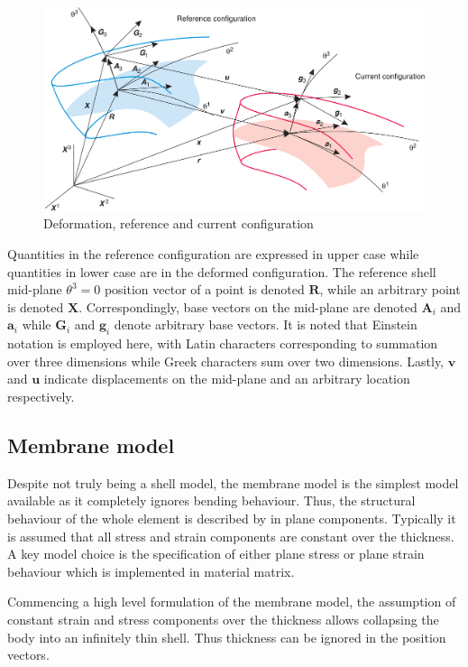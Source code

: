 \begin{figure}[H]
	\centering
	\def\svgwidth{\columnwidth}
	\includegraphics[width=12cm]{images/shellsconfig.png}
	\caption{Deformation, reference and current configuration \cite{BischLitBook04}}
	\label{shellsconfig}
\end{figure}

Quantities in the reference configuration are expressed in upper case while quantities in lower case are in the deformed configuration. The reference shell mid-plane $\theta^3 = 0$ position vector of a point is denoted $\mathbf{R}$, while an arbitrary point is denoted $\mathbf{X}$. Correspondingly, base vectors on the mid-plane are denoted $\mathbf{A}_i$ and $\mathbf{a}_i$ while $\mathbf{G}_i$ and $\mathbf{g}_i$ denote arbitrary base vectors. It is noted that Einstein notation is employed here, with Latin characters corresponding to summation over three dimensions while Greek characters sum over two dimensions. Lastly, $\mathbf{v}$ and $\mathbf{u}$ indicate displacements on the mid-plane and an arbitrary location respectively.

\subsection{Membrane model}

Despite not truly being a shell model, the membrane model is the simplest model available as it completely ignores bending behaviour. Thus, the structural behaviour of the whole element is described by in plane components. Typically it is assumed that all stress and strain components are constant over the thickness. A key model choice is the specification of either plane stress or plane strain behaviour which is implemented in material matrix.

Commencing a high level formulation of the membrane model, the assumption of constant strain and stress components over the thickness allows collapsing the body into an infinitely thin shell. Thus thickness can be ignored in the position vectors.

